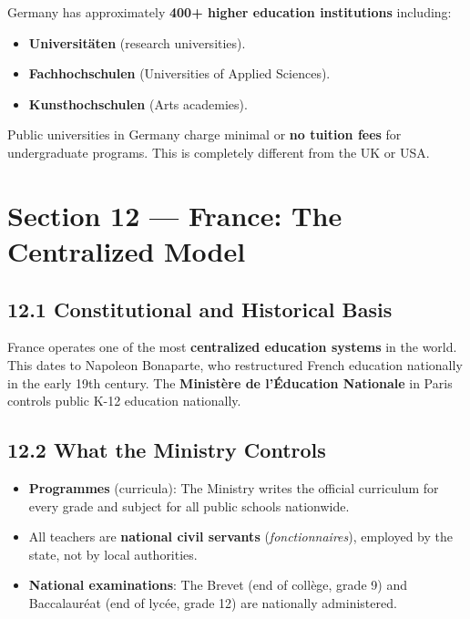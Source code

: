 	Germany has approximately \textbf{400+ higher education institutions} including:
	\begin{itemize}
		\item \textbf{Universitäten} (research universities).
		\item \textbf{Fachhochschulen} (Universities of Applied Sciences).
		\item \textbf{Kunsthochschulen} (Arts academies).
	\end{itemize}

	Public universities in Germany charge minimal or \textbf{no tuition fees} for undergraduate programs. This is completely different from the UK or USA.

	\section{Section 12 --- France: The Centralized Model}

	\subsection{12.1 Constitutional and Historical Basis}

	France operates one of the most \textbf{centralized education systems} in the world. This dates to Napoleon Bonaparte, who restructured French education nationally in the early 19th century. The \textbf{Ministère de l'Éducation Nationale} in Paris controls public K-12 education nationally.

	\subsection{12.2 What the Ministry Controls}

	\begin{itemize}
		\item \textbf{Programmes} (curricula): The Ministry writes the official curriculum for every grade and subject for all public schools nationwide.
		\item All teachers are \textbf{national civil servants} (\textit{fonctionnaires}), employed by the state, not by local authorities.
		\item \textbf{National examinations}: The Brevet (end of collège, grade 9) and Baccalauréat (end of lycée, grade 12) are nationally administered.
	\end{itemize}

